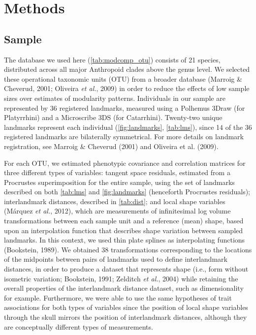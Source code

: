\documentclass[12pt,twoside]{report}
\begin{document}
\section{Methods}\label{methods}

\subsection{Sample}\label{sample}

The database we used here (\autoref{tab:modcomp_otu}) consists of 21
species, distributed across all major Anthropoid clades above the genus
level. We selected these operational taxonomic units (OTU) from a
broader database (Marroig \& Cheverud, 2001; Oliveira \emph{et al.},
2009) in order to reduce the effects of low sample sizes over estimates
of modularity patterns. Individuals in our sample are represented by 36
registered landmarks, measured using a Polhemus 3Draw (for Platyrrhini)
and a Microscribe 3DS (for Catarrhini). Twenty-two unique landmarks
represent each individual (\autoref{fig:landmarks}, \autoref{tab:lms}),
since 14 of the 36 registered landmarks are bilaterally symmetrical. For
more details on landmark registration, see Marroig \& Cheverud (2001)
and Oliveira et al. (2009).



For each OTU, we estimated phenotypic covariance and correlation
matrices for three different types of variables: tangent space
residuals, estimated from a Procrustes superimposition for the entire
sample, using the set of landmarks described on both \autoref{tab:lms}
and \autoref{fig:landmarks} (henceforth Procrustes residuals);
interlandmark distances, described in \autoref{tab:dist}; and local
shape variables (Márquez \emph{et al.}, 2012), which are measurements of
infinitesimal log volume transformations between each sample unit and a
reference (mean) shape, based upon an interpolation function that
describes shape variation between sampled landmarks. In this context, we
used thin plate splines as interpolating functions (Bookstein, 1989). We
obtained 38 transformations corresponding to the locations of the
midpoints between pairs of landmarks used to define interlandmark
distances, in order to produce a dataset that represents shape (i.e.,
form without isometric variation; Bookstein, 1991; Zelditch \emph{et
al.}, 2004) while retaining the overall properties of the interlandmark
distance dataset, such as dimensionality for example. Furthermore, we
were able to use the same hypotheses of trait associations for both
types of variables since the position of local shape variables through
the skull mirrors the position of interlandmark distances, although they
are conceptually different types of measurements.
\end{document}
